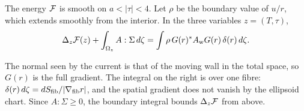 \begin{proposition}\label{prop:balance}
The energy $\mathcal F$ is smooth on $a<|\tau|<4$. Let $\rho$ be the boundary value of $u/r$, which
extends smoothly from the interior. In the three variables $z=(T,\tau)$,
\begin{equation}\label{eq:balance}
\Delta_z\mathcal F(z)+\int_{\Omega_z}A:\Sigma\,d\zeta=\int\rho\,G(r)^*A_{\rm w}G(r)\,\delta(r)\,d\zeta .
\end{equation}
\end{proposition}

The normal seen by the current is that of the moving wall in the total space, so $G(r)$ is the
full gradient. The integral on the right is over one fibre: $\delta(r)\,d\zeta=dS_{\rm fib}/|\nabla_{\rm fib}r|$,
and the spatial gradient does not vanish by the ellipsoid chart. Since $A:\Sigma\ge0$, the
boundary integral bounds $\Delta_z\mathcal F$ from above.

